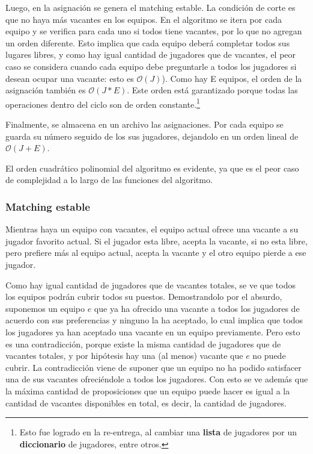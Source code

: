 \documentclass[article,a4paper]{article}
\newcommand{\bigO}{\mathcal{O}}
\begin{document}
Luego, en la asignación se genera el matching estable. La condición de corte es que no haya más vacantes en los equipos. En el algoritmo se itera por cada equipo y se verifica para cada uno si todos tiene vacantes, por lo que no agregan un orden diferente. Esto implica que cada equipo deberá completar todos sus lugares libres, y como hay igual cantidad de jugadores que de vacantes, el peor caso se considera cuando cada equipo debe preguntarle a todos los jugadores si desean ocupar una vacante: esto es $\bigO(J)$). Como hay E equipos, el orden de la asignación también es $\bigO(J*E)$. Este orden está garantizado porque todas las operaciones dentro del ciclo son de orden constante.\footnote{Esto fue logrado en la re-entrega, al cambiar una \textbf{lista} de jugadores por un \textbf{diccionario} de jugadores, entre otros.}



Finalmente, se almacena en un archivo las asignaciones. Por cada equipo se guarda su número seguido de los sus jugadores, dejandolo en un orden lineal de $\bigO(J+E)$.

El orden cuadrático polinomial del algoritmo es evidente, ya que es el peor caso de complejidad a lo largo de las funciones del algoritmo.

\subsubsection{Matching estable}

Mientras haya un equipo con vacantes, el equipo actual ofrece una vacante a su jugador favorito actual. Si el jugador esta libre, acepta la vacante, si no esta libre, pero prefiere más al equipo actual, acepta la vacante y el otro equipo pierde a ese jugador.

Como hay igual cantidad de jugadores que de vacantes totales, se ve que todos los equipos podrán cubrir todos su puestos. Demostrandolo por el absurdo, suponemos un equipo $e$ que ya ha ofrecido una vacante a todos los jugadores de acuerdo con sus preferencias y ninguno la ha aceptado, lo cual implica que todos los jugadores ya han aceptado una vacante en un equipo previamente. Pero esto es una contradicción, porque existe la misma cantidad de jugadores que de vacantes totales, y por hipótesis hay una (al menos) vacante que $e$ no puede cubrir. La contradicción viene de suponer que un equipo no ha podido satisfacer una de sus vacantes ofreciéndole a todos los jugadores. Con esto se ve además que la máxima cantidad de proposiciones que un equipo puede hacer es igual a la cantidad de vacantes disponibles en total, es decir, la cantidad de jugadores.
\end{document}
